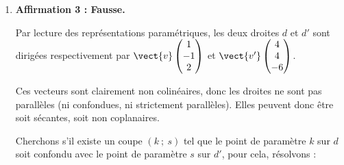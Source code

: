 \begin{enumerate}
	On a bien :\quad $\vect{n} \cdot \vect{\mathrm{OA}} = 5 \times (-1) + (-2) \times 0 + 1 \times 5 = -5 + 0 + 5 = 0$ et $\vect{n}$ est donc bien orthogonal à $\vect{\mathrm{OA}}$,

	par contre, on a :\quad $\vect{n} \cdot \vect{\mathrm{OB}} = 5 \times 3 + (-2) \times 2 + 1 \times (-1) = 15 - 4 - 1 = 10 \neq 0$ et $\vect{n}$ n'est donc pas orthogonal à $\vect{\mathrm{OB}}$.

	Ainsi, $\vect{n}$ n'est pas orthogonal au plan (OAB), car il n'est pas orthogonal à deux vecteurs définissant une base de ce plan.

	\item \textbf{Affirmation 3 : Fausse.}

	Par lecture des représentations paramétriques, les deux droites $d$ et $d'$ sont dirigées respectivement par $\vect{v} \begin{pmatrix} 1 \\-1\\2\end{pmatrix}$ et  $\vect{v'} \begin{pmatrix} 4 \\4\\-6\end{pmatrix}$.

	Ces vecteurs sont clairement non colinéaires, donc les droites ne sont pas parallèles (ni confondues, ni strictement parallèles). Elles peuvent donc être soit sécantes, soit non coplanaires.

	Cherchons s'il existe un coupe $(k~;~s)$ tel que le point de paramètre $k$ sur $d$ soit confondu avec le point de paramètre $s$ sur $d'$, pour cela, résolvons :


\end{enumerate}
